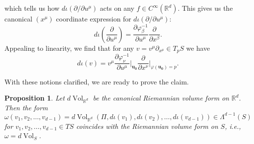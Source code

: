 \documentclass{article}
\newcommand{\p}{\partial}
\newcommand{\R}{\mathbb{R}}
\newcommand{\f}[2]{\frac{#1}{#2}}
\theoremstyle{theorem}
\newtheorem{proposition}[theorem]{Proposition}
\newcommand{\Vol}{\operatorname{Vol}}
\begin{document}
which tells us how $d\iota(\partial/\partial u^\mu)$ acts on any $f\in C^{\infty}(\R^d)$. This gives us the canonical $(x^\mu)$ coordinate expression for $d\iota(\partial/\partial u^{\mu})$:
\begin{equation*}
d\iota\left(\frac{\partial}{\partial u^{\mu}}\right)=\frac{\partial\varphi_\beta^{-1}}{\partial u^{\mu}}\frac{\partial}{\partial x^\beta}.
\end{equation*}
Appealing to linearity, we find that for any $v = v^\mu \p_{x^\mu} \in T_p S$ we have
\begin{equation*}
d\iota(v)= v^\mu\f{\p \varphi_\nu^{-1}}{\p u^\mu}\bigg\vert_{\mathbf{u_0}} \f{\p }{\p x^\nu}\bigg\vert_{\varphi(\mathbf{u_0}) = p}.
\end{equation*}



With these notions clarified, we are ready to prove the claim.
\begin{proposition}\label{prop:dVolsCoincide}
Let $d\Vol_{\mathbb{R}^d}$ be the canonical Riemannian volume form on $\mathbb{R}^d$. Then the form
\begin{equation*}
\omega(v_1,v_2,\dots,v_{d-1})=d\Vol_{\mathbb{R}^d}(\Pi,d\iota(v_1),d\iota(v_2),\dots,d\iota(v_{d-1})) \in \Lambda^{d-1}(S)
\end{equation*}
for $v_1,v_2,\dots,v_{d-1}\in TS$ coincides with the Riemannian volume form on $S$, i.e., $\omega=d\Vol_S$.
\end{proposition}
\end{document}
